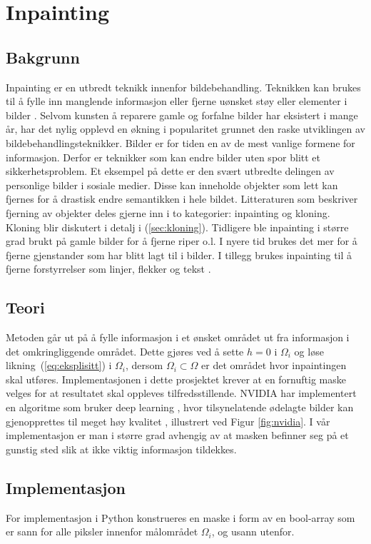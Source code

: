 \section{Inpainting}
\label{sec:Inpainting}
\subsection{Bakgrunn}
Inpainting er en utbredt teknikk innenfor bildebehandling. Teknikken kan brukes til å fylle inn manglende informasjon eller fjerne uønsket støy eller elementer i bilder \cite{papers0171:online}. Selvom kunsten å reparere gamle og forfalne bilder har eksistert i mange år, har det nylig opplevd en økning i popularitet grunnet den raske utviklingen av bildebehandlingsteknikker. Bilder er for tiden en av de mest vanlige formene for informasjon. Derfor er teknikker som kan endre bilder uten spor blitt et sikkerhetsproblem. Et eksempel på dette er den svært utbredte delingen av personlige bilder i sosiale medier. Disse kan inneholde objekter som lett kan fjernes for å drastisk endre semantikken i hele bildet. Litteraturen som beskriver fjerning av objekter deles gjerne inn i to kategorier: inpainting og kloning. Kloning blir diskutert i detalj i (\ref{sec:kloning}). Tidligere ble inpainting i større grad brukt på gamle bilder for å fjerne riper o.l. I nyere tid brukes det mer for å fjerne gjenstander som har blitt lagt til i bilder. I tillegg brukes inpainting til å fjerne forstyrrelser som linjer, flekker og tekst \cite{1909063938:online}.

\subsection{Teori}
 Metoden går ut på å fylle informasjon i et ønsket området ut fra informasjon i det omkringliggende området. Dette gjøres ved å sette $h=0$ i $\Omega_i$ og løse likning~(\ref{eq:eksplisitt}) i $\Omega_i$, dersom $\Omega_i \subset \Omega$ er det området hvor inpaintingen skal utføres. Implementasjonen i dette prosjektet krever at en fornuftig maske velges for at resultatet skal oppleves tilfredsstillende. NVIDIA har implementert en algoritme som bruker deep learning \cite{wiki:Deep_learning}, hvor tilsynelatende ødelagte bilder kan gjenopprettes til meget høy kvalitet \cite{180407722:nvidia}, illustrert ved Figur \ref{fig:nvidia}. I vår implementasjon er man i større grad avhengig av at masken befinner seg på et gunstig sted slik at ikke viktig informasjon tildekkes.
 
 \subsection{Implementasjon}
 For implementasjon i Python konstrueres en maske i form av en bool-array som er sann for alle piksler innenfor målområdet $\Omega_i$, og usann utenfor.

